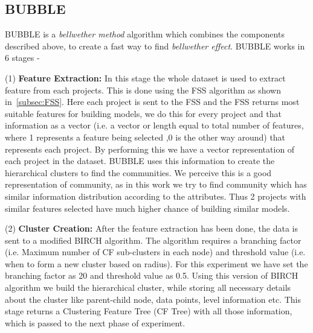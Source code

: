 \documentclass[sigconf,review]{acmart}
\theoremstyle{break}
\begin{document}
\subsection{BUBBLE}
\label{BUBBLE}

BUBBLE is a \textit{bellwether method} algorithm which combines the components described above, to create a fast way to find \textit{bellwether effect}. BUBBLE works in 6 stages - 

    (1) \textbf{Feature Extraction:} In this stage the whole dataset is used to extract feature from each projects. This is done using the FSS algorithm as shown in~\ref{subsec:FSS}. Here each project is sent to the FSS and the FSS returns most suitable features for building models, we do this for every project and that information as a vector (i.e. a vector or length equal to total number of features, where 1 represents a feature being selected ,0 is the other way around) that represents each project. By performing this we have a vector representation of each project in the dataset. BUBBLE uses this information to create the hierarchical clusters to find the communities. We perceive this is a good representation of community, as in this work we try to find community which has similar information distribution according to the attributes. Thus 2 projects with similar features selected have much higher chance of building similar models.
    
    (2) \textbf{Cluster Creation:} After the feature extraction has been done, the data is sent to a modified BIRCH algorithm. The algorithm requires a branching factor (i.e. Maximum number of CF sub-clusters in each node) and threshold value (i.e. when to form a new cluster based on radius). For this experiment we have set the branching factor as 20 and threshold value as 0.5. Using this version of BIRCH algorithm we build the hierarchical cluster, while storing all necessary details about the cluster like parent-child node, data points, level information etc. This stage returns a Clustering Feature Tree (CF Tree) with all those information, which is passed to the next phase of experiment. 
    
\end{document}
